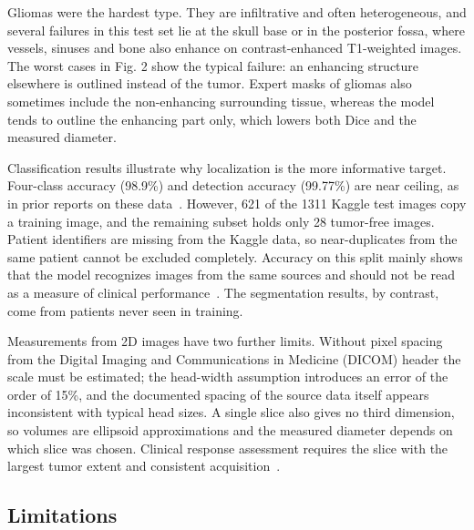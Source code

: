 \documentclass[pdflatex,sn-vancouver-num,iicol]{sn-jnl}
\begin{document}
Gliomas were the hardest type. They are infiltrative and often heterogeneous, and several failures in this test set lie at the skull base or in the posterior fossa, where vessels, sinuses and bone also enhance on contrast-enhanced T1-weighted images. The worst cases in Fig. 2 show the typical failure: an enhancing structure elsewhere is outlined instead of the tumor. Expert masks of gliomas also sometimes include the non-enhancing surrounding tissue, whereas the model tends to outline the enhancing part only, which lowers both Dice and the measured diameter.

Classification results illustrate why localization is the more informative target. Four-class accuracy (98.9\%) and detection accuracy (99.77\%) are near ceiling, as in prior reports on these data~\cite{swati2019,deepak2019}. However, 621 of the 1311 Kaggle test images copy a training image, and the remaining subset holds only 28 tumor-free images. Patient identifiers are missing from the Kaggle data, so near-duplicates from the same patient cannot be excluded completely. Accuracy on this split mainly shows that the model recognizes images from the same sources and should not be read as a measure of clinical performance~\cite{varoquaux2022,roberts2021}. The segmentation results, by contrast, come from patients never seen in training.

Measurements from 2D images have two further limits. Without pixel spacing from the Digital Imaging and Communications in Medicine (DICOM) header the scale must be estimated; the head-width assumption introduces an error of the order of 15\%, and the documented spacing of the source data itself appears inconsistent with typical head sizes. A single slice also gives no third dimension, so volumes are ellipsoid approximations and the measured diameter depends on which slice was chosen. Clinical response assessment requires the slice with the largest tumor extent and consistent acquisition~\cite{wen2010rano}.

\subsection{Limitations}
\end{document}
